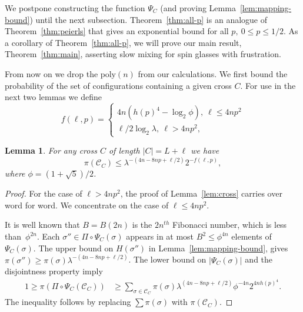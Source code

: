\documentclass[letterpaper,english,numberwithinsect]{amsart}
\newtheorem{lemma}{Lemma}[section]
\newcommand{\cC}{\mathcal{C}}
\begin{document}
We postpone constructing the function $\Psi_C$ 
(and proving Lemma~\ref{lem:mapping-bound}) until the next subsection. 
Theorem~\ref{thm:all-p} is an analogue of Theorem~\ref{thm:peierls} that gives an exponential
bound for all $p,~0\leq p\leq 1/2$. 
As a corollary of Theorem~\ref{thm:all-p}, we will prove our main result, Theorem~\ref{thm:main},
 asserting slow mixing for spin glasses with frustration.

From now on we drop the $\mathrm{poly}(n)$ from our calculations.
We first bound the probability of the set of configurations containing a given cross $C$.
For use in the next two lemmas we define
\begin{equation*}
f(\ell, p) =
\begin{cases}
  4n (h(p)^4 - \log_2\phi), ~ \ell \leq 4np^2 \\
  \ell/2 \log_2\lambda, ~ \ell > 4np^2 ,
\end{cases}
\end{equation*}

\begin{lemma}\label{lem:piOmegaC}
For any cross $C$ of length $|C| = L + \ell$   we have
\begin{equation*}
\pi(\cC_C ) \leq  \lambda^{-(4n-8np+\ell/2)} 2^{-f(\ell, p)},
\end{equation*}
where 
$\phi = {(1+\sqrt{5})}/{2}$.
\end{lemma}

\begin{proof}
For the case of $\ell > 4np^2$, the proof of Lemma~\ref{lem:cross} carries over word for word. 
We concentrate on the case of $\ell \leq 4np^2$.

It is well known that $B = B(2n)$ is the $2n^{th}$ Fibonacci number, which is less than~$\phi^{2n}$.
Each $\sigma'' \in \Pi\circ\Psi_C(\sigma)$ appears in at most $B^2 \leq \phi^{4n}$ 
elements of $\Psi_C(\sigma)$. 
The upper bound on $H(\sigma'')$ in Lemma~\ref{lem:mapping-bound}, gives $\pi(\sigma'') \geq \pi(\sigma)\lambda^{-(4n-8np+\ell/2)}$.
The lower bound on $|\Psi_C(\sigma)|$ and the disjointness property imply
\begin{align}
1 \geq \pi(\Pi\circ\Psi_C(\cC_C )) & \geq \sum_{\sigma\in\cC_C } \pi(\sigma)  \lambda^{(4n-8np+\ell/2)} 
      \phi^{-4n}  2^{4n h(p)^4}.
\end{align}
The inequality follows by replacing $\sum \pi(\sigma)$ with $\pi(\cC_C )$.
\end{proof}
\end{document}
